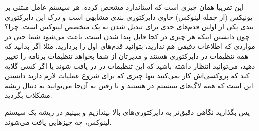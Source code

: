 این تقریبا همان چیزی است که استاندارد 
 مشخص کرده. هر سیستم عامل مبتنی بر یونیکس (از جمله لینوکس) حاوی دایرکتوری بندی مشابهی است و درک این دایرکتوری بندی یکی از اولین قدم‌های جدی برای تبدیل شدن به یک متخصص لینوکس است. چرا؟ چون دانستن اینکه هر چیزی در کجا قابل پیدا شدن است،‌ باعث می‌شود شما حتی در مواردی که اطلاعات دقیقی هم ندارید، بتوانید قدم‌های اول را بردارید. مثلا اگر بدانید که همه تنظیمات در دایرکتوری
هستند و مدیرتان از شما بخواهد تنظیمات برنامه 
 را تغییر دهید، می‌توانید انتظار داشته باشید که این تنظیمات در در
یافت شوند یا اگر کسی گلایه کند که پروکسی‌اش کار نمی‌کنید تنها چیزی که برای شروع عملیات لازم دارید دانستن این است که همه لاگ‌های سیستم در
هستند و با رفتن به آن‌جا می‌توانید به دنبال ریشه مشکلات بگردید.

پس بگذارید نگاهی دقیق‌تر به دایرکتوری‌های بالا بیندازیم و ببینیم در ریشه یک سیستم لینوکس، چه چیزهایی یافت می‌شوند.
